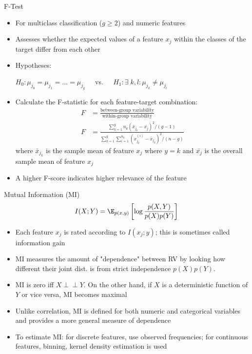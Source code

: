 \documentclass[11pt,compress,t,notes=noshow, xcolor=table]{beamer}
\begin{document}
  \begin{vbframe}{F-Test}
  \begin{itemize}
    \item For multiclass classification ($g \ge 2$) and numeric features
    \item Assesses whether the expected values of a feature $x_j$ within the classes of the target differ from each other
    \item Hypotheses:

    $H_0: \mu_{j_0} = \mu_{j_1} = \dots = \mu_{j_g} \;\;\;\;$ vs. $\;\;\;\;H_1 : \exists \; k,l: \mu_{j_k} \neq \mu_{j_l}$
    \item Calculate the F-statistic for each feature-target combination:
    \begin{align*}
    F &= \frac{\text{between-group variability}}{\text{within-group variability}}\\
    F &= \frac{\sum_{k = 1}^g n_k (\bar{x}_{j_k} - \bar{x_j})^2/(g-1)}{\sum_{k = 1}^g \sum_{i = 1}^{n_k} (x_{j_k}^{(i)} - \bar{x}_{j_k})^2/(n-g)}
    \end{align*}
    where $\bar{x}_{j_k}$ is the sample mean of feature $x_j$ where $y = k$ and $\bar{x_{j}}$ is the overall sample mean of feature $x_j$
  \item A higher F-score indicates higher relevance of the feature
  \end{itemize}
  \end{vbframe}

  \begin{vbframe}{Mutual Information (MI)}
  $$I(X ; Y) = \E_{p(x, y)} \left[ \log \frac{p(X, Y)}{p(X) p(Y)} \right]$$

  \begin{itemize}
  \setlength{\itemsep}{0.8em}
    \item Each feature $x_j$ is rated according to $I(x_j;y)$; this is sometimes called information gain
    \item MI measures the amount of "dependence" between RV by looking how
    different their joint dist. is from strict independence $p(X)p(Y)$.
    \item MI is zero iff $X \perp \!\!\! \perp Y$. On the other hand, if $X$ is a deterministic function of $Y$ or vice versa, MI becomes maximal
  \item Unlike correlation, MI is defined for both numeric and categorical variables and provides a more general measure of dependence
  \item To estimate MI: for discrete features, use observed frequencies; for continuous features, binning, kernel density estimation is used
  \end{itemize}
  \end{vbframe}

  \endlecture
\end{document}
